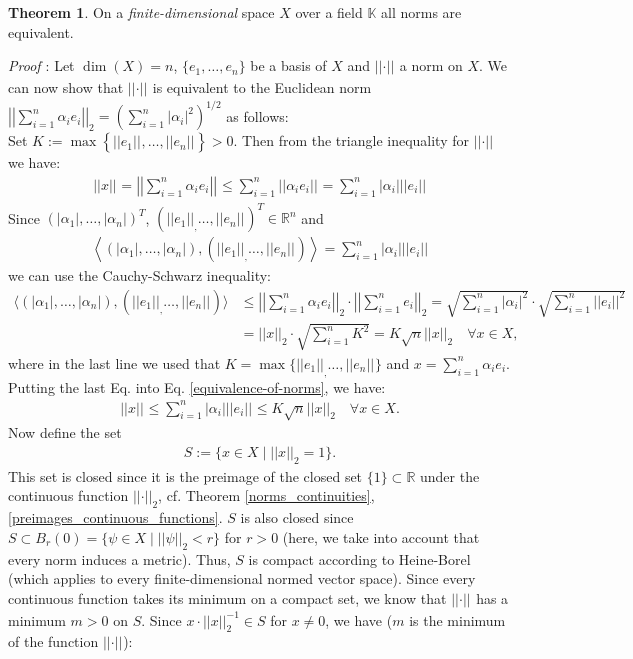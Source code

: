 \documentclass[12pt, a4paper]{article}
\numberwithin{equation}{section}
\theoremstyle{definition}
\theoremstyle{definition}
\newtheorem{theorem}[thm]{Theorem}
\newcommand{\norm}[2]{\left\vert\left\vert #1 \right\vert\right\vert_{#2}}
\newcommand{\abs}[1]{\left\vert #1 \right\vert}
\begin{document}
	\begin{theorem}\label{finite_dimensional_norm_equivalence}
		On a \textit{finite-dimensional} space $X$ over a field $\mathbb{K}$ all norms are equivalent. 
	\end{theorem}
	\noindent\textit{Proof \cite[p. 27f.]{werner-fa}}: Let $\dim(X) = n$, $\{e_1, \dots, e_n\}$ be a basis of $X$ and $\norm{\cdot}{}$ a norm on $X$. We can now show that $\norm{\cdot}{}$ is equivalent to the Euclidean norm $\norm{\sum_{i = 1}^n\alpha_ie_i}{2} = \left( \sum_{i = 1}^{n}\left\vert \alpha_i \right\vert^2 \right)^{1/2}$ as follows: \\[6pt] Set $K:= \max\left\{ \norm{e_1}{}, \dots, \norm{e_n}{}\right\} > 0$. Then from the triangle inequality for $\norm{\cdot}{}$ we have: 
	\begin{align}\label{equivalence-of-norms}
		\norm{x}{} = \norm{\sum_{i= 1}^{n}\alpha_ie_i}{} \leq \sum_{i= 1}^n \norm{\alpha_ie_i}{} = \sum_{i= 1}^n \abs{\alpha_i} \norm{e_i}{}
	\end{align}
	Since $(\abs{\alpha_1}, \dots, \abs{\alpha_n})^T$, $(\norm{e_1}, \dots, \norm{e_n}{})^T\in \mathbb R^n$ and 
	\begin{align}
		\left\langle \left(\abs{\alpha_1}, \dots, \abs{\alpha_n}\right), (\norm{e_1}, \dots, \norm{e_n}{} ) \right\rangle = \sum_{i = 1}^n \abs{\alpha_i}\norm{e_i}{}
	\end{align}
	we can use the Cauchy-Schwarz inequality: 
	\begin{align}
		\langle (\abs{\alpha_1}, \dots, \abs{\alpha_n}), (\norm{e_1}, \dots, \norm{e_n}{} ) \rangle &\leq \norm{\sum_{i=1}^n \alpha_ie_i}{2}\cdot \norm{\sum_{i= 1}^n e_i}{2} = \sqrt{\sum_{i = 1}^n\abs{\alpha_i}^2} \cdot \sqrt{\sum_{i = 1}^n\norm{e_i}{}^2}
		\\[8pt] &= \norm{x}{2}\cdot \sqrt{\sum_{i=1}^n K^2} = K\sqrt{n}\norm{x}{2} \quad \forall x\in X, 
	\end{align}
	where in the last line we used that $K = \max\{\norm{e_1}, \dots, \norm{e_n}{}\}$ and $x = \sum_{i = 1}^n \alpha_i e_i$. Putting the last Eq. into Eq. \eqref{equivalence-of-norms}, we have: 
	\begin{align}\label{fa_equiv_norms_intermed_1}
		\norm{x}{} \leq \sum_{i=1}^{n} \abs{\alpha_i}\norm{e_i}{} \leq K\sqrt{n}\norm{x}{2} \quad \forall x\in X.
	\end{align}
	Now define the set 
	\begin{align}
		S:= \{ x\in X \mid \norm{x}{2} = 1 \}. 
	\end{align}
	This set is closed since it is the preimage of the closed set $\{1\}\subset \mathbb R$ under the continuous function $\norm{\cdot}{2}$, cf. Theorem \ref{norms_continuities}, \ref{preimages_continuous_functions}. $S$ is also closed since $S\subset B_{r}(0) = \{\psi\in X\mid \norm{\psi}{2} < r\}$ for $r>0$ (here, we take into account that every norm induces a metric). Thus, $S$ is compact according to Heine-Borel (which applies to every finite-dimensional normed vector space). Since every continuous function takes its minimum on a compact set, we know that $\norm{\cdot}{}$ has a minimum $m > 0$ on $S$. Since $x\cdot \norm{x}{2}^{-1}\in S$ for $x\ne 0$, we have ($m$ is the minimum of the function $\norm{\cdot}{}$): 
\end{document}
